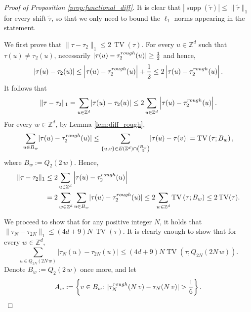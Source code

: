 \documentclass[11pt, reqno]{amsart}
\newcommand{\Z}{\mathbb{Z}}
\DeclareMathOperator{\supp}{supp}
\DeclareMathOperator{\TV}{TV}
\numberwithin{equation}{section}
\begin{document}
\begin{proof}[Proof of Proposition \ref{prop:functional_diff}]

It is clear that $|\supp(\tilde{\tau})|\le \|\tilde{\tau}\|_1$ for every shift $\tilde{\tau}$, so that we only need to bound the $\ell_1$ norms appearing in the statement.

We first prove that $\lVert \tau-\tau_2\rVert_1
\leq 2\, \TV(\tau)$. 
For every $u\in\Z^d$ such that $\tau(u)\neq\tau_2(u)$, necessarily $\lvert \tau(u)-\tau^{\rm rough}_2(u)\rvert\geq\frac{1}{2}$ and hence, 
$$
\left\lvert\tau(u)-\tau_2(u)\right\rvert\leq \left\lvert\tau(u)-\tau^{\rm rough}_2(u)\right\rvert+\frac{1}{2}\leq 2\left\lvert\tau(u)-\tau^{\rm rough}_2(u)\right\rvert.$$
It follows that 
$$ 
\lVert \tau-\tau_2\rVert_1=\sum_{u\in\Z^d}\lvert\tau(u)-\tau_2(u)\rvert\leq 2\sum_{u\in\Z^d}\left\lvert\tau(u)-\tau^{\rm rough}_2(u)\right\rvert.
$$
For every $w\in\Z^d$, by Lemma \ref{lem:diff_rough}, 
$$
\sum_{u\in B_w}\lvert\tau(u)-\tau^{\rm rough}_2(u)\rvert\leq \sum_{\{u,v\}\in E(\Z^d)\cap\binom{B_w}{2}}\lvert\tau(u)-\tau(v)\rvert=\TV\left(\tau;B_w\right),
$$
where $B_w:=Q_2(2\,w)$.
Hence,
\begin{align*} 
\lVert \tau-\tau_2\rVert_1&\leq 2\sum_{u\in\Z^d}\left\lvert\tau(u)-\tau^{\rm rough}_2(u)\right\rvert\\&=2\sum_{w\in\Z^d}\sum_{u\in B_w}\lvert\tau(u)-\tau^{\rm rough}_2(u)\rvert
\leq 2\sum_{w\in\Z^d}\TV\left(\tau;B_w\right)\leq 2\TV(\tau).
\end{align*}

We proceed to show that for any positive integer $N$, it holds that $\lVert \tau_N-\tau_{2N}\rVert_1
\leq (4d+9)N\, \TV(\tau)$.
It is clearly enough to show that for every $w\in \mathbb Z^d$, 
$$
\sum_{u\in Q_{2N}(2N\,w)} \lvert \tau_N(u) -\tau_{2N} (u) \rvert\leq (4d+9)N \TV\left(\tau;Q_{2N}(2N\,w)\right).
$$
Denote $B_w:=Q_2(2\,w)$ once more, and let 
$$A_w:=\left\{v\in B_w\colon \lvert\tau^{\rm rough}_N(N\,v)-\tau_N(N\,v)\rvert>\frac{1}{6}\right\}.$$


\end{proof}
\end{document}
